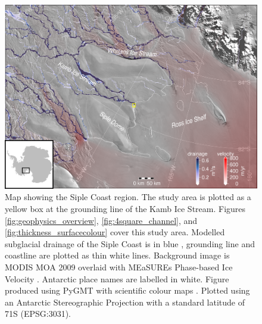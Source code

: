 \begin{figure}[!ht]
\centering
\includegraphics[width=1\textwidth]{chapters/2/fieldwork_location_small.png}
\caption[Fieldwork location]{Map showing the Siple Coast region. The study area is plotted as a yellow box at the grounding line of the Kamb Ice Stream. Figures \ref{fig:geophysics_overview}, \ref{fig:4square_channel}, and \ref{fig:thickness_surfacecolour} cover this study area. Modelled subglacial drainage of the Siple Coast is in blue \citep{le2009subglacial}, grounding line and coastline \citep{depoorter2013calving} are plotted as thin white lines. Background image is MODIS MOA 2009 \citep{haran2014modis} overlaid with MEaSUREs Phase-based Ice Velocity \citep{mouginot2019continent}. Antarctic place names are labelled in white. Figure produced using PyGMT \citep{uieda2021pygmt,wessel2019generic} with scientific colour maps \citep{crameri2018scientific}. Plotted using an Antarctic Stereographic Projection with a standard latitude of 71\textdegree S (EPSG:3031).}
\label{fig:fieldwork_location}
\end{figure} 

